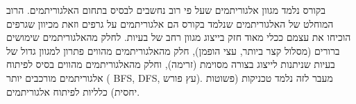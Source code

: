 בקורס נלמד מגוון אלגוריתמים שעל פי רוב נחשבים לבסיס בתחום האלגוריתמים.
הרוב המוחלט של האלגוריתמים שנלמד בקורס הם אלגוריתמים על גרפים 
וזאת מכיוון שגרפים הוכיחו את עצמם ככלי מאוד חזק בייצוג מגוון רחב של בעיות.
לחלק מהאלגוריתמים שימושים ברורים (מסלול קצר ביותר, עצי הופמן), 
חלק מהאלגוריתמים מהווים פתרון למגוון גדול של בעיות שניתנות לייצוג בצורה מסוימת (זרימה), 
וחלק מהאלגוריתמים מהווים בסיס לפיתוח אלגוריתמים מורכבים יותר (%
\textenglish{BFS},
\textenglish{DFS}, 
עץ פורש).
מעבר לזה נלמד טכניקות (פשוטות יחסית) כלליות לפיתוח אלגוריתמים.

